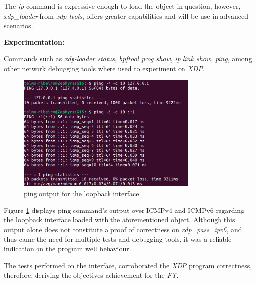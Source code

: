 The \textit{ip} command is expressive enough to load the object in question, however, \textit{xdp\_loader} from \textit{xdp-tools}, offers greater capabilities and will be use in advanced scenarios.

\noindent \textbf{Experimentation:}

Commands such as \textit{xdp-loader status}, \textit{bpftool prog show}, \textit{ip link show}, \textit{ping}, among other network debugging tools where used to experiment on \textit{XDP}.

\begin{figure}[h]
    \centering
    \includegraphics[width=250pt]{src/figures/ping-test.png}
    \caption{ping output for the loopback interface}
    \label{fig:ping-test}
\end{figure}

Figure \ref{fig:ping-test} displays ping command's output over ICMPv4 and ICMPv6 regarding the loopback interface loaded with the aforementioned object.
Although this output alone does not constitute a proof of correctness on \textit{xdp\_pass\_ipv6}, and thus came the need for multiple tests and debugging tools, it was a reliable indication on the program well behaviour.   

The tests performed on the interface, corroborated the \textit{XDP} program correctness, therefore, deriving the objectives achievement for the \textit{FT}.